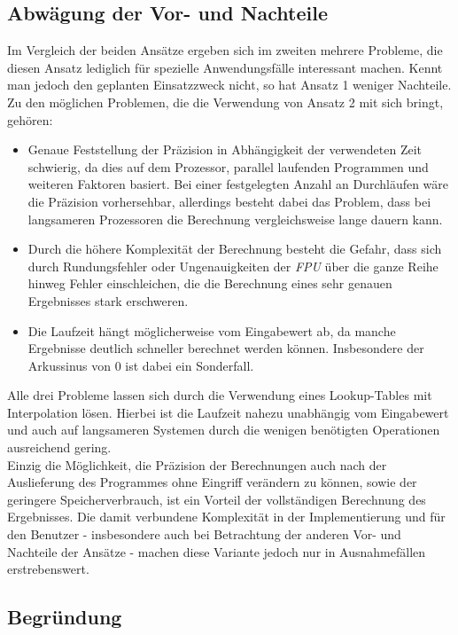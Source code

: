 \documentclass{article}
\begin{document}
	\subsection{Abwägung der Vor- und Nachteile}
		Im Vergleich der beiden Ansätze ergeben sich im zweiten mehrere Probleme, die diesen Ansatz lediglich für spezielle Anwendungsfälle interessant machen. Kennt man jedoch den geplanten Einsatzzweck nicht, so hat Ansatz 1 weniger Nachteile. Zu den möglichen Problemen, die die Verwendung von Ansatz 2 mit sich bringt, gehören:

		\begin{itemize}
			\item Genaue Feststellung der Präzision in Abhängigkeit der verwendeten Zeit schwierig, da dies auf dem Prozessor, parallel laufenden Programmen und weiteren Faktoren basiert. Bei einer festgelegten Anzahl an Durchläufen wäre die Präzision vorhersehbar, allerdings besteht dabei das Problem, dass bei langsameren Prozessoren die Berechnung vergleichsweise lange dauern kann.
			\item Durch die höhere Komplexität der Berechnung besteht die Gefahr, dass sich durch Rundungsfehler oder Ungenauigkeiten der \emph{FPU} über die ganze Reihe hinweg Fehler einschleichen, die die Berechnung eines sehr genauen Ergebnisses stark erschweren.
			\item Die Laufzeit hängt möglicherweise vom Eingabewert ab, da manche Ergebnisse deutlich schneller berechnet werden können. Insbesondere der Arkussinus von $0$ ist dabei ein Sonderfall.
		\end{itemize}
		Alle drei Probleme lassen sich durch die Verwendung eines Lookup-Tables mit Interpolation lösen. Hierbei ist die Laufzeit nahezu unabhängig vom Eingabewert und auch auf langsameren Systemen durch die wenigen benötigten Operationen ausreichend gering.\\
		Einzig die Möglichkeit, die Präzision der Berechnungen auch nach der Auslieferung des Programmes ohne Eingriff verändern zu können, sowie der geringere Speicherverbrauch, ist ein Vorteil der vollständigen Berechnung des Ergebnisses. Die damit verbundene Komplexität in der Implementierung und für den Benutzer - insbesondere auch bei Betrachtung der anderen Vor- und Nachteile der Ansätze - machen diese Variante jedoch nur in Ausnahmefällen erstrebenswert.

	\subsection{Begründung}
\end{document}
